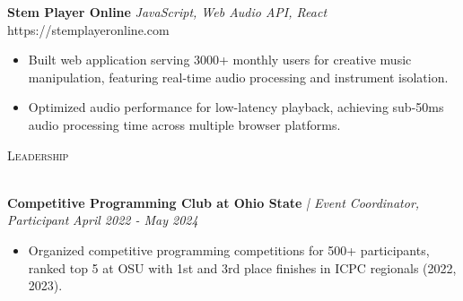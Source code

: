 \documentclass[letterpaper]{article}
\newcommand{\lineunder} {
    \vspace*{-8pt} \\
    \hspace*{-18pt} \hrulefill \\
}
\newcommand{\header} [1] {
    {\hspace*{-18pt}\vspace*{6pt} \textsc{#1}}
    \vspace*{-6pt} \lineunder
}
\begin{document}
    {\textbf{Stem Player Online}} {\sl JavaScript, Web Audio API, React} \hfill https://stemplayeronline.com\\
    \vspace{-2mm}
    \begin{itemize} \itemsep -1mm

        \item Built web application serving 3000+ monthly users for creative music manipulation, featuring real-time audio processing and instrument isolation.
        
        \item Optimized audio performance for low-latency playback, achieving sub-50ms audio processing time across multiple browser platforms.
        
    \end{itemize}
    \vspace{-2mm}

\header{Leadership}
\vspace{1mm}

    \textbf{Competitive Programming Club at Ohio State} \textit{| Event Coordinator, Participant} \hfill \textsl{April 2022 - May 2024}\\
    \vspace{-2mm}
    \begin{itemize} \itemsep -1mm
    
        \item Organized competitive programming competitions for 500+ participants, ranked top 5 at OSU with 1st and 3rd place finishes in ICPC regionals (2022, 2023).

    \end{itemize}
    \vspace{-1mm}
\end{document}
